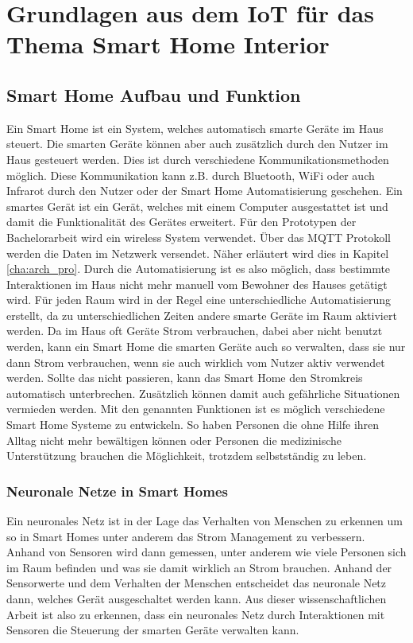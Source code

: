 \chapter{Grundlagen aus dem IoT für das Thema Smart Home Interior}
\label{cha:grdl}

\section{Smart Home Aufbau und Funktion}
Ein Smart Home ist ein System, welches automatisch smarte Geräte im Haus steuert. Die smarten Geräte können aber auch zusätzlich durch den Nutzer im Haus gesteuert werden. Dies ist durch verschiedene Kommunikationsmethoden möglich. Diese Kommunikation kann z.B. durch Bluetooth, WiFi oder auch Infrarot durch den Nutzer oder der Smart Home Automatisierung geschehen. Ein smartes Gerät ist ein Gerät, welches mit einem Computer ausgestattet ist und damit die Funktionalität des Gerätes erweitert. Für den Prototypen der Bachelorarbeit wird ein wireless System verwendet. Über das MQTT Protokoll werden die Daten im Netzwerk versendet. Näher erläutert wird dies in Kapitel \ref{cha:arch_pro}. 
\newline
Durch die Automatisierung ist es also möglich, dass bestimmte Interaktionen im Haus nicht mehr manuell vom Bewohner des Hauses getätigt wird. Für jeden Raum wird in der Regel eine unterschiedliche Automatisierung erstellt, da zu unterschiedlichen Zeiten andere smarte Geräte im Raum aktiviert werden. Da im Haus oft Geräte Strom verbrauchen, dabei aber nicht benutzt werden, kann ein Smart Home die smarten Geräte auch so verwalten, dass sie nur dann Strom verbrauchen, wenn sie auch wirklich vom Nutzer aktiv verwendet werden. Sollte das nicht passieren, kann das Smart Home den Stromkreis automatisch unterbrechen. Zusätzlich können damit auch gefährliche Situationen vermieden werden. \citep{sripan2012research}
\newline
Mit den genannten Funktionen ist es möglich verschiedene Smart Home Systeme zu entwickeln. So haben Personen die ohne Hilfe ihren Alltag nicht mehr bewältigen können oder Personen die medizinische Unterstützung brauchen die Möglichkeit, trotzdem selbstständig zu leben. 

\subsection{Neuronale Netze in Smart Homes}
Ein neuronales Netz ist in der Lage das Verhalten von Menschen zu erkennen um so in Smart Homes unter anderem das Strom Management zu verbessern. Anhand von Sensoren wird dann gemessen, unter anderem wie viele Personen sich im Raum befinden und was sie damit wirklich an Strom brauchen. Anhand der Sensorwerte und dem Verhalten der Menschen entscheidet das neuronale Netz dann, welches Gerät ausgeschaltet werden kann. \citep{badlani2011smart} Aus dieser wissenschaftlichen Arbeit ist also zu erkennen, dass ein neuronales Netz durch Interaktionen mit Sensoren die Steuerung der smarten Geräte verwalten kann.

